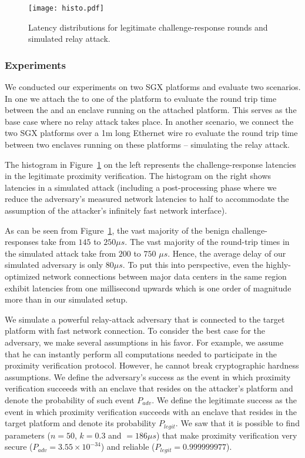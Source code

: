 \begin{figure}[t]
  \centering
    \texttt{[image: histo.pdf]} 
    \caption{Latency distributions for legitimate challenge-response rounds and simulated relay attack.}
    \label{graph:instatAttackerHisto}
\end{figure}


\subsubsection*{Experiments}

We conducted our experiments on two SGX platforms and evaluate two scenarios. In one we attach the \key to one of the platform to evaluate the round trip time between the \key and an enclave running on the attached platform. This serves as the base case where no relay attack takes place. In another scenario, we connect the two SGX platforms over a 1m long Ethernet wire ro evaluate the round trip time between two enclaves running on these platforms -- simulating the relay attack.

The histogram in Figure~\ref{graph:instatAttackerHisto} on the left represents the challenge-response latencies in the legitimate proximity verification. The histogram on the right shows latencies in a simulated attack (including a post-processing phase where we reduce the adversary's measured network latencies to half to accommodate the assumption of the attacker's infinitely fast network interface).

As can be seen from Figure~\ref{graph:instatAttackerHisto}, the vast majority of the benign challenge-responses take from $145$ to $250 \mu s$. The vast majority of the round-trip times in the simulated attack take from $200$ to $750$ $\mu s$. Hence, the average delay of our simulated adversary is only $80 \mu s$. To put this into perspective, even the highly-optimized network connections between major data centers in the same region exhibit latencies from one millisecond upwards which is one order of magnitude more than in our simulated setup.

We simulate a powerful relay-attack adversary that is connected to the target platform with fast network connection. To consider the best case for the adversary, we make several assumptions in his favor. For example, we assume that he can instantly perform all computations needed to participate in the proximity verification protocol. However, he cannot break cryptographic hardness assumptions. We define the adversary's success as the event in which proximity verification succeeds with an enclave that resides on the attacker's platform and denote the probability of such event $P_{adv}$. We define the legitimate success as the event in which proximity verification succeeds with an enclave that resides in the target platform and denote its probability $P_{legit}$. We saw that it is possible to find parameters ($n=50$, $k=0.3$ and \proximitee$=186 \mu s$) that make proximity verification very secure ($P_{adv}=3.55\times 10^{-34}$) and reliable ($P_{legit}=0.999999977$).




